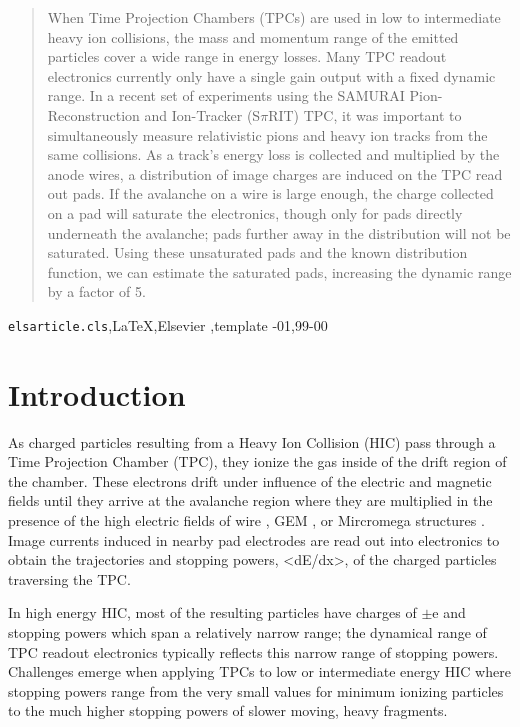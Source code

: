 \documentclass[review]{elsarticle}
\begin{document}
\begin{frontmatter}
\begin{abstract}
When Time Projection Chambers (TPCs) are used in low to intermediate heavy ion collisions, the mass and momentum range of the emitted particles cover a wide range in energy losses. Many TPC readout electronics currently only have a single gain output with a fixed dynamic range. In a recent set of experiments using the SAMURAI Pion-Reconstruction and Ion-Tracker (S$\pi$RIT) TPC, it was important to simultaneously measure relativistic pions and heavy ion tracks from the same collisions. As a track's energy loss is collected and multiplied by the anode wires, a distribution of image charges are induced on the TPC read out pads. If the avalanche on a wire is large enough, the charge collected on a pad will saturate the electronics, though only for pads directly underneath the avalanche; pads further away in the distribution will not be saturated. Using these unsaturated pads and the known distribution function, we can estimate the saturated pads, increasing the dynamic range by a factor of 5.

\end{abstract}

\begin{keyword}
\texttt{elsarticle.cls}\sep \LaTeX\sep Elsevier \sep template
-01\sep  99-00
\end{keyword}

\end{frontmatter}

\linenumbers

\section{Introduction} 

As charged particles resulting from a Heavy Ion Collision (HIC) pass through a Time Projection Chamber (TPC), they ionize the gas inside of the drift region of the chamber. These electrons drift under influence of the electric and magnetic fields until they arrive at the avalanche region where they are multiplied in the presence of the high electric fields of wire \cite{blumrol}, GEM \cite{gem}, or Mircromega structures \cite{micromeg}. Image currents induced in nearby pad electrodes are read out into electronics to obtain the trajectories and stopping powers, <dE/dx>, of the charged particles traversing the TPC.

In high energy HIC, most of the resulting particles have charges of $\pm$e and stopping powers which span a relatively narrow range; the dynamical range of TPC readout electronics typically reflects this narrow range of stopping powers. Challenges emerge when applying TPCs to low or intermediate energy HIC where stopping powers range from the very small values for minimum ionizing particles to the much higher stopping powers of slower moving, heavy fragments. 
\end{document}
